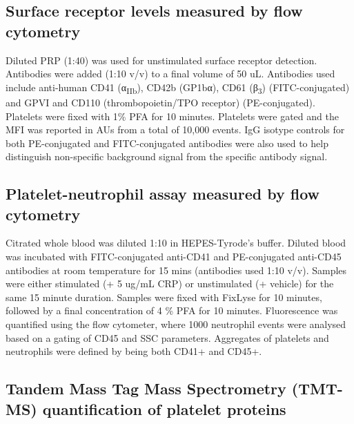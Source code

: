 \documentclass[11pt,twoside]{bristolthesis}
\begin{document}
\hypertarget{surface-receptor-levels-measured-by-flow-cytometry}{%
\subsection{Surface receptor levels measured by flow cytometry}\label{surface-receptor-levels-measured-by-flow-cytometry}}

Diluted PRP (1:40) was used for unstimulated surface receptor detection. Antibodies were added (1:10 v/v) to a final volume of 50 uL. Antibodies used include anti-human CD41 (α\textsubscript{IIb}), CD42b (GP1bα), CD61 (β\textsubscript{3}) (FITC-conjugated) and GPVI and CD110 (thrombopoietin/TPO receptor) (PE-conjugated). Platelets were fixed with 1\% PFA for 10 minutes. Platelets were gated and the MFI was reported in AUs from a total of 10,000 events. IgG isotype controls for both PE-conjugated and FITC-conjugated antibodies were also used to help distinguish non-specific background signal from the specific antibody signal.

\hypertarget{platelet-neutrophil-assay-measured-by-flow-cytometry}{%
\subsection{Platelet-neutrophil assay measured by flow cytometry}\label{platelet-neutrophil-assay-measured-by-flow-cytometry}}

Citrated whole blood was diluted 1:10 in HEPES-Tyrode's buffer. Diluted blood was incubated with FITC-conjugated anti-CD41 and PE-conjugated anti-CD45 antibodies at room temperature for 15 mins (antibodies used 1:10 v/v). Samples were either stimulated (+ 5 ug/mL CRP) or unstimulated (+ vehicle) for the same 15 minute duration. Samples were fixed with FixLyse for 10 minutes, followed by a final concentration of 4 \% PFA for 10 minutes. Fluorescence was quantified using the flow cytometer, where 1000 neutrophil events were analysed based on a gating of CD45 and SSC parameters. Aggregates of platelets and neutrophils were defined by being both CD41+ and CD45+.

\hypertarget{tandem-mass-tag-mass-spectrometry-tmt-ms-quantification-of-platelet-proteins}{%
\subsection{Tandem Mass Tag Mass Spectrometry (TMT-MS) quantification of platelet proteins}\label{tandem-mass-tag-mass-spectrometry-tmt-ms-quantification-of-platelet-proteins}}
\end{document}
